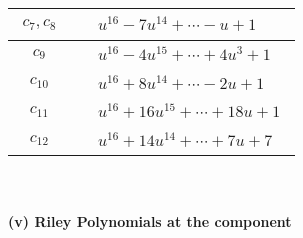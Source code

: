 \documentclass[1p]{elsarticle_modified}
\theoremstyle{definition}
\begin{document}
\begin{tabular}{m{50pt}|m{274pt}}
\hline $$\begin{aligned}c_{7},c_{8}\end{aligned}$$&$\begin{aligned}
&u^{16}-7 u^{14}+\cdots- u+1
\end{aligned}$\\
\hline $$\begin{aligned}c_{9}\end{aligned}$$&$\begin{aligned}
&u^{16}-4 u^{15}+\cdots+4 u^3+1
\end{aligned}$\\
\hline $$\begin{aligned}c_{10}\end{aligned}$$&$\begin{aligned}
&u^{16}+8 u^{14}+\cdots-2 u+1
\end{aligned}$\\
\hline $$\begin{aligned}c_{11}\end{aligned}$$&$\begin{aligned}
&u^{16}+16 u^{15}+\cdots+18 u+1
\end{aligned}$\\
\hline $$\begin{aligned}c_{12}\end{aligned}$$&$\begin{aligned}
&u^{16}+14 u^{14}+\cdots+7 u+7
\end{aligned}$\\
\hline
\end{tabular}\\~\\
\newpage\renewcommand{\arraystretch}{1}
\flushleft \textbf{(v) Riley Polynomials at the component}\newline \\
\end{document}
